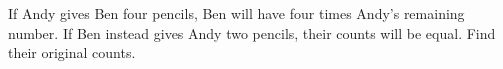 If Andy gives Ben four pencils, Ben will have four times Andy's remaining number. If Ben instead gives Andy two pencils, their counts will be equal. Find their original counts.
